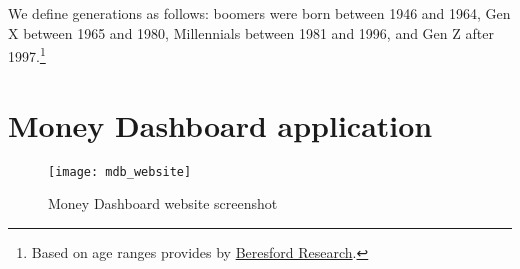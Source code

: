 \documentclass[a4paper, 11pt]{article}
\begin{document}
We define generations as follows: boomers were born between 1946 and 1964, Gen
X between 1965 and 1980, Millennials between 1981 and 1996, and Gen Z after
1997.\footnote{Based on age ranges provides by
    \href{https://www.beresfordresearch.com/age-range-by-generation/}{Beresford
Research}.}



\newpage
\printbibliography
\newpage

% 
\appendix

\section{Money Dashboard application}%
\label{sec:money_dashboard_application}

\begin{figure}[htpb]
    \centering
    \caption{Money Dashboard website screenshot}%
    \texttt{[image: mdb\_website]}
    \label{fig:mdb_website}
\end{figure}
\end{document}
